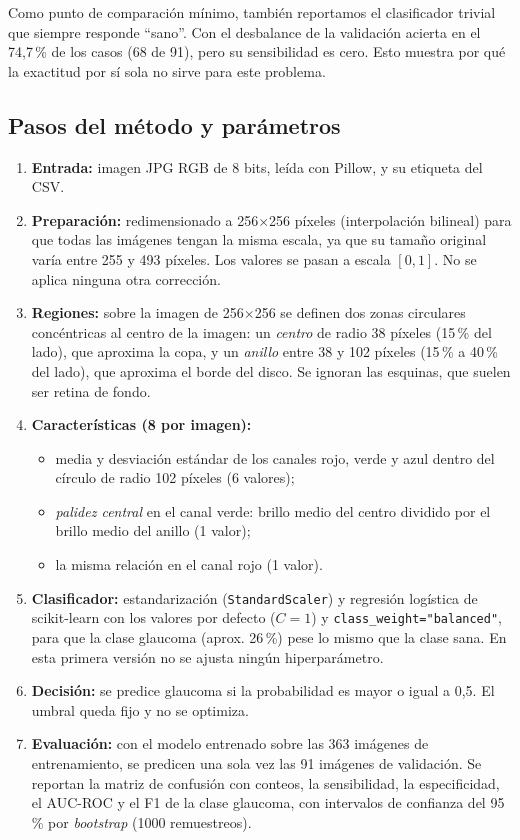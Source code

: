 \documentclass[pdflatex,sn-mathphys-num]{sn-jnl}%
\theoremstyle{thmstyleone}%
\theoremstyle{thmstyletwo}%
\theoremstyle{thmstylethree}%
\begin{document}
Como punto de comparación mínimo, también reportamos el clasificador trivial que siempre responde ``sano''. Con el desbalance de la validación acierta en el 74,7\,\% de los casos (68 de 91), pero su sensibilidad es cero. Esto muestra por qué la exactitud por sí sola no sirve para este problema.

\subsection{Pasos del método y parámetros}

\begin{enumerate}
\item \textbf{Entrada:} imagen JPG RGB de 8 bits, leída con Pillow, y su etiqueta del CSV.
\item \textbf{Preparación:} redimensionado a 256$\times$256 píxeles (interpolación bilineal) para que todas las imágenes tengan la misma escala, ya que su tamaño original varía entre 255 y 493 píxeles. Los valores se pasan a escala $[0,1]$. No se aplica ninguna otra corrección.
\item \textbf{Regiones:} sobre la imagen de 256$\times$256 se definen dos zonas circulares concéntricas al centro de la imagen: un \textit{centro} de radio 38 píxeles (15\,\% del lado), que aproxima la copa, y un \textit{anillo} entre 38 y 102 píxeles (15\,\% a 40\,\% del lado), que aproxima el borde del disco. Se ignoran las esquinas, que suelen ser retina de fondo.
\item \textbf{Características (8 por imagen):}
  \begin{itemize}
  \item media y desviación estándar de los canales rojo, verde y azul dentro del círculo de radio 102 píxeles (6 valores);
  \item \textit{palidez central} en el canal verde: brillo medio del centro dividido por el brillo medio del anillo (1 valor);
  \item la misma relación en el canal rojo (1 valor).
  \end{itemize}
\item \textbf{Clasificador:} estandarización (\texttt{StandardScaler}) y regresión logística de scikit-learn \cite{pedregosa2011scikit} con los valores por defecto ($C=1$) y \texttt{class\_weight=}\allowbreak\texttt{"balanced"}, para que la clase glaucoma (aprox. 26\,\%) pese lo mismo que la clase sana. En esta primera versión no se ajusta ningún hiperparámetro.
\item \textbf{Decisión:} se predice glaucoma si la probabilidad es mayor o igual a 0,5. El umbral queda fijo y no se optimiza.
\item \textbf{Evaluación:} con el modelo entrenado sobre las 363 imágenes de entrenamiento, se predicen una sola vez las 91 imágenes de validación. Se reportan la matriz de confusión con conteos, la sensibilidad, la especificidad, el AUC-ROC \cite{fawcett2006roc} y el F1 de la clase glaucoma, con intervalos de confianza del 95\,\% por \textit{bootstrap} (1000 remuestreos).
\end{enumerate}
\end{document}

